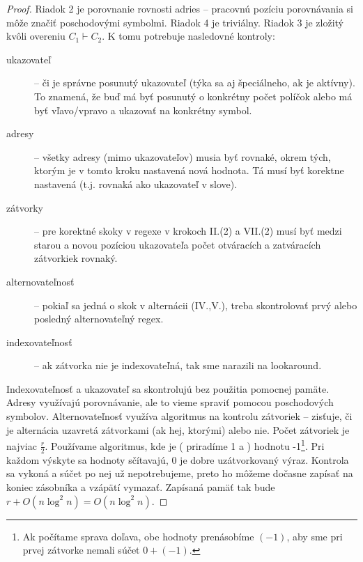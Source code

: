 \documentclass{svk_long_sk}
\begin{document}
\begin{proof}
Riadok 2 je porovnanie rovnosti adries -- pracovnú pozíciu porovnávania si môže značiť poschodovými symbolmi. Riadok 4 je triviálny. Riadok 3 je zložitý kvôli overeniu $C_1\vdash C_2$. K tomu potrebuje nasledovné kontroly:
\begin{description}
\item[ukazovateľ] -- či je správne posunutý ukazovateľ (týka sa aj špeciálneho, ak je aktívny). To znamená, že buď má byť posunutý o konkrétny počet políčok alebo má byť vľavo/vpravo a ukazovať na konkrétny symbol.
\item[adresy] -- všetky adresy (mimo ukazovateľov) musia byť rovnaké, okrem tých, ktorým je v tomto kroku nastavená nová hodnota. Tá musí byť korektne nastavená (t.j. rovnaká ako ukazovateľ v slove). 
\item[zátvorky] -- pre korektné skoky v regexe v krokoch II.(2) a VII.(2) musí byť medzi starou a novou pozíciou ukazovateľa počet otváracích a zatváracích zátvorkiek rovnaký.
\item[alternovateľnosť] -- pokiaľ sa jedná o skok v alternácii (IV.,V.), treba skontrolovať prvý alebo posledný alternovateľný regex.
\item[indexovateľnosť] -- ak zátvorka nie je indexovateľná, tak sme narazili na lookaround.
\end{description}
Indexovateľnosť a ukazovateľ sa skontrolujú bez použitia pomocnej pamäte. Adresy využívajú porovnávanie, ale to vieme spraviť pomocou poschodových symbolov. Alternovateľnosť využíva algoritmus na kontrolu zátvoriek -- zisťuje, či je alternácia uzavretá zátvorkami (ak hej, ktorými) alebo nie. Počet zátvoriek je najviac $\frac{r}{2}$. Používame algoritmus, kde je ( priradíme 1 a ) hodnotu -1\footnote{Ak počítame sprava doľava, obe hodnoty prenásobíme $(-1)$, aby sme pri prvej zátvorke nemali súčet $0+(-1)$.}. Pri každom výskyte sa hodnoty sčítavajú, 0 je dobre uzátvorkovaný výraz. Kontrola sa vykoná a súčet po nej už nepotrebujeme, preto ho môžeme dočasne zapísať na koniec zásobníka a vzápätí vymazať. Zapísaná pamäť tak bude $r+O(n\log^2n)=O(n\log^2n)$.
\end{proof}
\end{document}
